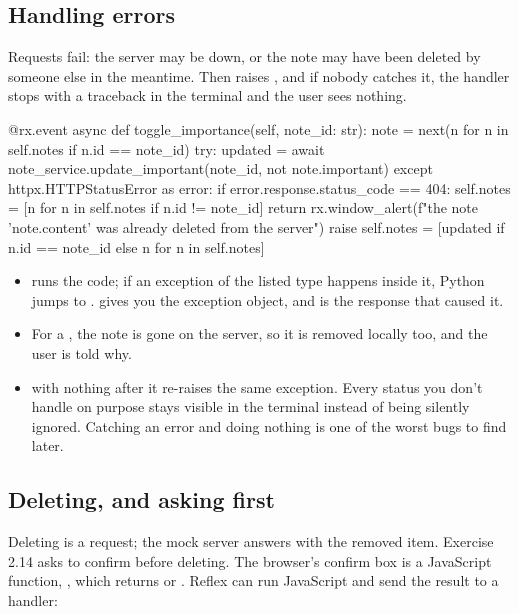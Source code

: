 \subsection{Handling errors}

Requests fail: the server may be down, or the note may have been deleted by someone else in the meantime. Then  raises , and if nobody catches it, the handler stops with a traceback in the terminal and the user sees nothing.

\begin{py}
@rx.event
async def toggle_importance(self, note_id: str):
	note = next(n for n in self.notes if n.id == note_id)
	try:
		updated = await note_service.update_important(note_id, not note.important)
	except httpx.HTTPStatusError as error:
		if error.response.status_code == 404:
			self.notes = [n for n in self.notes if n.id != note_id]
			return rx.window_alert(f"the note '{note.content}' was already deleted from the server")
		raise
	self.notes = [updated if n.id == note_id else n for n in self.notes]
\end{py}

\begin{itemize}
\item {} runs the code; if an exception of the listed type happens inside it, Python jumps to .  gives you the exception object, and  is the response that caused it.
\item For a , the note is gone on the server, so it is removed locally too, and the user is told why.
\item {} with nothing after it re-raises the same exception. Every status you don't handle on purpose stays visible in the terminal instead of being silently ignored. Catching an error and doing nothing is one of the worst bugs to find later.
\end{itemize}

\subsection{Deleting, and asking first}

Deleting is a  request; the mock server answers with the removed item. Exercise 2.14 asks to confirm before deleting. The browser's confirm box is a JavaScript function, , which returns  or . Reflex can run JavaScript and send the result to a handler:

